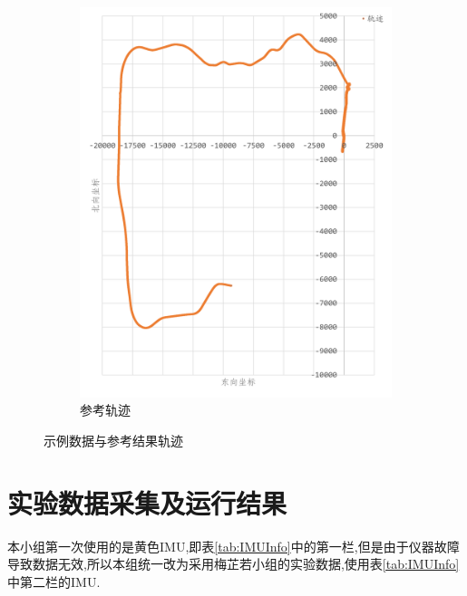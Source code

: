 \documentclass[10pt,a4paper]{ctexart}
\begin{document}
\begin{figure}[H]
{\begin{subfigure}{0.49\textwidth}
            \includegraphics[width=\linewidth]{Figures/DataFigure/示例数据参考结果轨迹.png}
            \caption*{参考轨迹}
        \end{subfigure}
    }
    \caption{示例数据与参考结果轨迹}
    \label{fig:5.3}
\end{figure}

\section{实验数据采集及运行结果}

本小组第一次使用的是黄色\textsf{IMU},即表\ref{tab:IMUInfo}中的第一栏,但是由于仪器故障导致数据无效,所以本组统一改为采用梅芷若小组的实验数据,使用表\ref{tab:IMUInfo}中第二栏的\textsf{IMU}.
\end{document}
